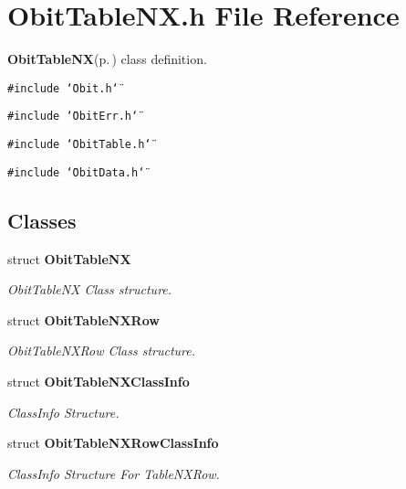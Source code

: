 \section{Obit\-Table\-NX.h File Reference}
\label{ObitTableNX_8h}
{\bf Obit\-Table\-NX}{\rm (p.\,\pageref{structObitTableNX})} class definition. 

{\tt \#include \char`\"{}Obit.h\char`\"{}}\par
{\tt \#include \char`\"{}Obit\-Err.h\char`\"{}}\par
{\tt \#include \char`\"{}Obit\-Table.h\char`\"{}}\par
{\tt \#include \char`\"{}Obit\-Data.h\char`\"{}}\par
\subsection*{Classes}
\begin{CompactItemize}
\item 
struct {\bf Obit\-Table\-NX}
\begin{CompactList}\small\item\em Obit\-Table\-NX Class structure. \item\end{CompactList}\item 
struct {\bf Obit\-Table\-NXRow}
\begin{CompactList}\small\item\em Obit\-Table\-NXRow Class structure. \item\end{CompactList}\item 
struct {\bf Obit\-Table\-NXClass\-Info}
\begin{CompactList}\small\item\em Class\-Info Structure. \item\end{CompactList}\item 
struct {\bf Obit\-Table\-NXRow\-Class\-Info}
\begin{CompactList}\small\item\em Class\-Info Structure For Table\-NXRow. \item\end{CompactList}\end{CompactItemize}
